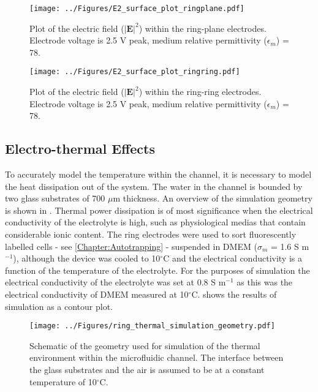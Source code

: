 \begin{figure}[p]
 \centering
 \texttt{[image: ../Figures/E2\_surface\_plot\_ringplane.pdf]}
 \caption[Plot of the electric field ($\left | E \right | ^{2}$) within the ring-plane electrodes.]{Plot of the electric field ($\left | \textbf{E} \right | ^{2}$) within the ring-plane electrodes. Electrode voltage is 2.5 V peak, medium relative permittivity ($\epsilon_{m}$) = 78.}
 \label{fig:E2_surface_plot_ringplane}
\end{figure}

\begin{figure}[p]
 \centering
 \texttt{[image: ../Figures/E2\_surface\_plot\_ringring.pdf]}
 \caption[Plot of the electric field ($\left | E \right | ^{2}$) within the ring-ring electrodes.]{Plot of the electric field ($\left | \textbf{E} \right | ^{2}$) within the ring-ring electrodes. Electrode voltage is 2.5 V peak, medium relative permittivity ($\epsilon_{m}$) = 78.}
 \label{fig:E2_surface_plot_ringring}
\end{figure}

\subsection{Electro-thermal Effects}

To accurately model the temperature within the channel, it is necessary to model the heat dissipation out of the system. The water in the channel is bounded by two glass substrates of 700 $\mu$m thickness. An overview of the simulation geometry is shown in . Thermal power dissipation is of most significance when the electrical conductivity of the electrolyte is high, such as physiological medias that contain considerable ionic content. The ring electrodes were used to sort fluorescently labelled cells - see \cref{Chapter:Autotrapping} - suspended in DMEM ($\sigma_{m}$ = 1.6 S m$^{-1}$), although the device was cooled to 10$^{\circ}$C and the electrical conductivity is a function of the temperature of the electrolyte. For the purposes of simulation the electrical conductivity of the electrolyte was set at 0.8 S m$^{-1}$ as this was the electrical conductivity of DMEM measured at 10$^{\circ}$C.  shows the results of simulation as a contour plot.

\begin{figure}[p]
	\centering
		\texttt{[image: ../Figures/ring\_thermal\_simulation\_geometry.pdf]}
	\caption[Simulation geometry for ring trap electrothermal simulation.]{Schematic of the geometry used for simulation of the thermal environment within the microfluidic channel. The interface between the glass substrates and the air is assumed to be at a constant temperature of 10$^{\circ}$C.}
	\label{fig:ring_thermal_simulation_geometry}
\end{figure}

